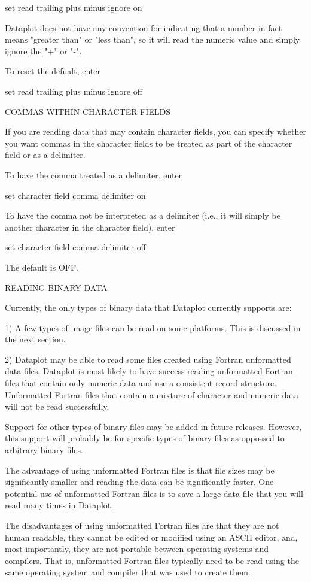     set read trailing plus minus ignore on

Dataplot does not have any convention for indicating that a number
in fact means "greater than" or "less than", so it will read the
numeric value and simply ignore the "+" or "-".

To reset the defualt, enter

    set read trailing plus minus ignore off

COMMAS WITHIN CHARACTER FIELDS

If you are reading data that may contain character fields, you can
specify whether you want commas in the character fields to be
treated as part of the character field or as a delimiter.

To have the comma treated as a delimiter, enter

    set character field comma delimiter on

To have the comma not be interpreted as a delimiter (i.e., it
will simply be another character in the character field), enter
 
    set character field comma delimiter off

The default is OFF.

READING BINARY DATA

Currently, the only types of binary data that Dataplot currently
supports are:

  1) A few types of image files can be read on some platforms.
     This is discussed in the next section.

  2) Dataplot may be able to read some files created using Fortran
     unformatted data files.  Dataplot is most likely to have success
     reading unformatted Fortran files that contain only numeric data
     and use a consistent record structure.  Unformatted Fortran
     files that contain a mixture of character and numeric data
     will not be read successfully.

Support for other types of binary files may be added in future
releases.  However, this support will probably be for specific
types of binary files as oppossed to arbitrary binary files.

The advantage of using unformatted Fortran files is that file sizes
may be significantly smaller and reading the data can be significantly
faster.  One potential use of unformatted Fortran files is to save
a large data file that you will read many times in Dataplot.

The disadvantages of using unformatted Fortran files are that they
are not human readable, they cannot be edited or modified using an
ASCII editor, and, most importantly, they are not portable between
operating systems and compilers.  That is, unformatted Fortran files
typically need to be read using the same operating system and compiler
that was used to create them.

